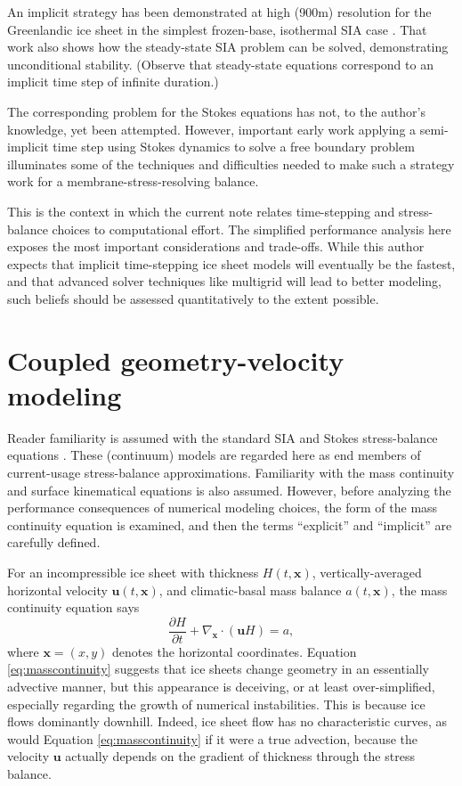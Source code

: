 \documentclass[review,letterpaper]{igs}
\newcommand\bu{\mathbf{u}}
\newcommand\bx{\mathbf{x}}
\newcommand{\Divx}{\nabla_\bx \cdot}
\begin{document}
An implicit strategy has been demonstrated at high (900m) resolution for the Greenlandic ice sheet in the simplest frozen-base, isothermal SIA case \citep{Bueler2016}.  That work also shows how the steady-state SIA problem \citep[c.f.][]{JouvetBueler2012} can be solved, demonstrating unconditional stability.  (Observe that steady-state equations correspond to an implicit time step of infinite duration.)

The corresponding problem for the Stokes equations has not, to the author's knowledge, yet been attempted.  However, important early work applying a semi-implicit time step using Stokes dynamics \citep{WirbelJarosch2020} to solve a free boundary problem illuminates some of the techniques and difficulties needed to make such a strategy work for a membrane-stress-resolving balance.

This is the context in which the current note relates time-stepping and stress-balance choices to computational effort.  The simplified performance analysis here exposes the most important considerations and trade-offs.  While this author expects that implicit time-stepping ice sheet models will eventually be the fastest, and that advanced solver techniques like multigrid \citep{Briggsetal2000} will lead to better modeling, such beliefs should be assessed quantitatively to the extent possible.


\section{Coupled geometry-velocity modeling}

Reader familiarity is assumed with the standard SIA and Stokes stress-balance equations \citep{GreveBlatter2009,SchoofHewitt2013}.  These (continuum) models are regarded here as end members of current-usage stress-balance approximations.  Familiarity with the mass continuity and surface kinematical equations \citep{GreveBlatter2009} is also assumed.  However, before analyzing the performance consequences of numerical modeling choices, the form of the mass continuity equation is examined, and then the terms ``explicit'' and ``implicit'' are carefully defined.

For an incompressible ice sheet with thickness $H(t,\bx)$, vertically-averaged horizontal velocity $\bu(t,\bx)$, and climatic-basal mass balance $a(t,\bx)$, the mass continuity equation says
\begin{equation}
\frac{\partial H}{\partial t} + \Divx \left(\bu H\right) = a, \label{eq:masscontinuity}
\end{equation}
where $\bx=(x,y)$ denotes the horizontal coordinates.  Equation \eqref{eq:masscontinuity} suggests that ice sheets change geometry in an essentially advective manner, but this appearance is deceiving, or at least over-simplified, especially regarding the growth of numerical instabilities.  This is because ice flows dominantly downhill.  Indeed, ice sheet flow has no characteristic curves, as would Equation \eqref{eq:masscontinuity} if it were a true advection, because the velocity $\bu$ actually depends on the gradient of thickness through the stress balance.
\end{document}
